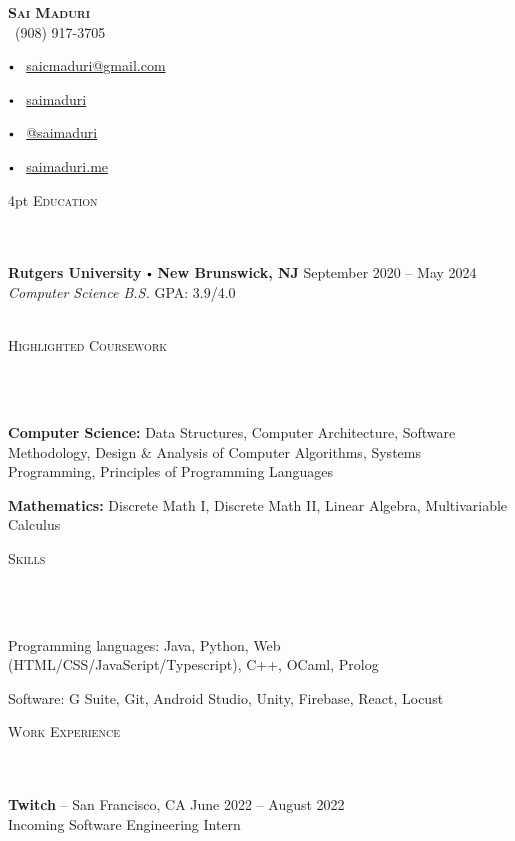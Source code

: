 \documentclass{article}
\newcommand{\contact}[3]{
\vspace*{3pt}
\begin{center}
{\LARGE \scshape {#1}}\\
\vspace{5pt}
#2 
\vspace{2pt}
#3
\end{center}
\vspace*{-8pt}
}
\newcommand{\header}[1]{{
\hspace*{0pt}\vspace*{6pt} \textsc{#1}} \vspace*{-6pt} 
\lineunder
}
\newcommand{\lineunder}{
\vspace*{-8pt} \\ \hspace*{-3pt} 
\hrulefill \\
}
\newcommand{\college}[7]{
\textbf{#1} \labelitemi \textbf{#2} \hfill #3 \\ #4 \hfill #7 \\ #5 \\ #6 \vspace*{5pt}
}
\newcommand{\employer}[4]{{
\vspace*{2pt}%
\textbf{#1} #2 \hfill #3\\ #4 \vspace*{2pt}}
}
\renewcommand{\labelitemi}{
$\vcenter{\hbox{\tiny$\bullet$}}$\hspace*{3pt}
}
\renewcommand{\labelitemii}{
$\vcenter{\hbox{\tiny$\bullet$}}$\hspace*{-3pt}
}
\newenvironment{bullet-list-major}{
\begin{list}{\labelitemii}{\setlength\leftmargin{9pt} 
\topsep 0pt \itemsep -2pt}}{\vspace*{4pt}\end{list}
}
\begin{document}
\small
\smallskip
\vspace*{-44pt}

\contact{\textbf{Sai Maduri}}
{\faPhone\ (908) 917-3705
\labelitemi \faEnvelope\ \href{mailto:saicmaduri@gmail.com}{saicmaduri@gmail.com}
\labelitemi \faLinkedin\ \href{https://www.linkedin.com/in/saimaduri/}{saimaduri}
\labelitemi \faGithub\ \href{https://github.com/saimaduri}{@saimaduri}%
\labelitemi \faLink\ \href{https://saimaduri.me}{saimaduri.me}
}

\vspace{4pt}
\header{Education}
    \college{Rutgers University}{New Brunswick, NJ}{September 2020 -- May 2024}
    {\textit{Computer Science B.S.}}
    {}{} 
    {GPA: 3.9/4.0}
    
\vspace*{4pt}%
\header{Highlighted Coursework}
    \begin{bullet-list-major}
    \item \textbf{Computer Science:} Data Structures, Computer Architecture, Software Methodology, Design \& Analysis of Computer Algorithms, Systems Programming, Principles of Programming Languages
    \item \textbf{Mathematics:} Discrete Math I, Discrete Math II, Linear Algebra, Multivariable Calculus
    \end{bullet-list-major}

\vspace*{4pt}%
\header{Skills}
    \begin{bullet-list-major}
    \item Programming languages: Java, Python, Web (HTML/CSS/JavaScript/Typescript), C++, OCaml, Prolog
    \item Software: G Suite, Git, Android Studio, Unity, Firebase, React, Locust
    \end{bullet-list-major}
    
\vspace*{4pt}%
\header{Work Experience}
    \employer{Twitch}
    {-- San Francisco, CA }{June 2022 -- August 2022}{Incoming Software Engineering Intern}
    
\end{document}
